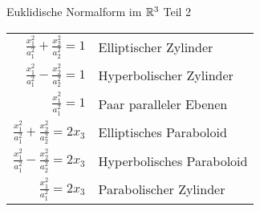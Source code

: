 \documentclass[main.tex]{subfiles}
\begin{document}
\begin{karte}{Euklidische Normalform im \( \mathbb{R}^3 \) Teil 2}
    {\renewcommand{\arraystretch}{1.5}
    \begin{center}
    \begin{tabular}{|r|l|}
        \hline
        \( \frac{x_1^2}{a_1^2} + \frac{x_2^2}{a_2^2} = 1 \) & Elliptischer Zylinder \\
        \( \frac{x_1^2}{a_1^2} - \frac{x_2^2}{a_2^2} = 1 \) & Hyperbolischer Zylinder \\
        \( \frac{x_1^2}{a_1^2} = 1 \) & Paar paralleler Ebenen \\
        \hline 
        \( \frac{x_1^2}{a_1^2} + \frac{x_2^2}{a_2^2} = 2x_3 \) & Elliptisches Paraboloid \\
        \( \frac{x_1^2}{a_1^2} - \frac{x_2^2}{a_2^2} = 2x_3 \) & Hyperbolisches Paraboloid \\
        \( \frac{x_1^2}{a_1^2} = 2x_3 \) & Parabolischer Zylinder \\
        \hline
    \end{tabular}
    \end{center}}
\end{karte}
\end{document}
